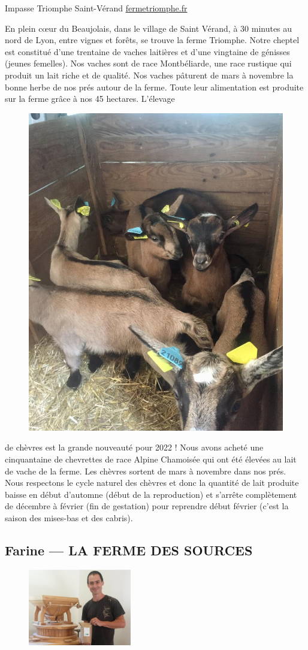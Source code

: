 \documentclass[8pt,a4paper,french]{article}
\makeatletter
\newcommand{\authoredby}[1]{\addtocontents{toc}{\protect\@nameuse{authoredby#1}}}%
\makeatother
\begin{document}
 Impasse Triomphe Saint-Vérand\newline
\href{https://fermetriomphe.fr/}{fermetriomphe.fr}\newline

\noindent En plein c{\oe}ur du Beaujolais, dans le village de Saint Vérand, à 30
minutes au nord de Lyon, entre vignes et forêts, se trouve la ferme
Triomphe.  Notre cheptel est constitué d'une trentaine de vaches
laitières et d'une vingtaine de génisses (jeunes femelles). Nos vaches
sont de race Montbéliarde, une race rustique qui produit un lait riche
et de qualité. Nos vaches pâturent de mars à novembre la bonne herbe
de nos prés autour de la ferme. Toute leur alimentation est produite
sur la ferme grâce à nos 45 hectares.  L'élevage\newline

\begin{figure}
\includegraphics[height=0.3\textwidth]{TRIOMPHE2.jpg}
\end{figure}

\noindent de chèvres est la grande nouveauté pour 2022 ! Nous avons acheté une
cinquantaine de chevrettes de race Alpine Chamoisée qui ont été
élevées au lait de vache de la ferme.  Les chèvres sortent de mars à
novembre dans nos prés.  Nous respectons le cycle naturel des chèvres
et donc la quantité de lait produite baisse en début d'automne (début
de la reproduction) et s'arrête complètement de décembre à février
(fin de gestation) pour reprendre début février (c'est la saison des
mises-bas et des cabris).

\vspace{10em}

\authoredby{B}
\subsection{Farine --- LA FERME DES SOURCES}\label{subsec:farine}

\begin{figure}
\includegraphics[width=0.4\textwidth]{BERNARD.jpg}
\end{figure}
\end{document}
